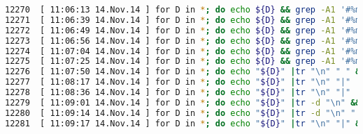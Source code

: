 \begin{fullwidth}
\begin{lstlisting}[basicstyle={\tiny\ttfamily},language=bash,tabsize=4]
12270  [ 11:06:13 14.Nov.14 ] for D in *; do echo ${D} && grep -A1 '#%module' ${D} | sed 's/#%module//g' |sed 's/#% description: //g'; done
12271  [ 11:06:39 14.Nov.14 ] for D in *; do echo ${D} && grep -A1 '#%module' ${D} | tr "\n" " " |sed 's/#%module//g' |sed 's/#% description: //g'; done
12272  [ 11:06:49 14.Nov.14 ] for D in *; do echo ${D} && grep -A1 '#%module' ${D} | tr "\n" "p " |sed 's/#%module//g' |sed 's/#% description: //g'; done
12273  [ 11:06:56 14.Nov.14 ] for D in *; do echo ${D} && grep -A1 '#%module' ${D} | tr "\n" "\n" |sed 's/#%module//g' |sed 's/#% description: //g'; done
12274  [ 11:07:04 14.Nov.14 ] for D in *; do echo ${D} && grep -A1 '#%module' ${D} | tr "\n" "_" |sed 's/#%module//g' |sed 's/#% description: //g'; done
12275  [ 11:07:25 14.Nov.14 ] for D in *; do echo ${D} && grep -A1 '#%module' ${D} |sed 's/#%module//g' |sed 's/#% description: //g'; done
12276  [ 11:07:50 14.Nov.14 ] for D in *; do echo "${D}" |tr "\n" " " && grep -A1 '#%module' ${D} |sed 's/#%module//g' |sed 's/#% description: //g'; done
12277  [ 11:08:17 14.Nov.14 ] for D in *; do echo "${D}" |tr "\n" "|" |tr "\n" " " && grep -A1 '#%module' ${D} |sed 's/#%module//g' |sed 's/#% description: //g'; done
12278  [ 11:08:36 14.Nov.14 ] for D in *; do echo "${D}" |tr "\n" "|" |tr -d "\n" && grep -A1 '#%module' ${D} |sed 's/#%module//g' |sed 's/#% description: //g'; done
12279  [ 11:09:01 14.Nov.14 ] for D in *; do echo "${D}" |tr -d "\n" && grep -A1 '#%module' ${D} |sed 's/#%module//g' |sed 's/#% description: //g'; done
12280  [ 11:09:14 14.Nov.14 ] for D in *; do echo "${D}" |tr -d "\n" "|" && grep -A1 '#%module' ${D} |sed 's/#%module//g' |sed 's/#% description: //g'; done
12281  [ 11:09:17 14.Nov.14 ] for D in *; do echo "${D}" |tr "\n" "|" && grep -A1 '#%module' ${D} |sed 's/#%module//g' |sed 's/#% description: //g'; done
\end{lstlisting}
\end{fullwidth}

